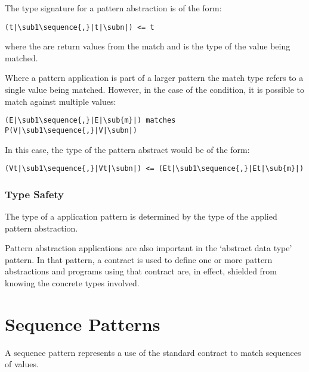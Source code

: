 The type signature for a pattern abstraction is of the form:
\begin{lstlisting}[escapechar=|]
(t|\sub1\sequence{,}|t|\subn|) <= t
\end{lstlisting}
where the  are return values from the match and  is the type of the value being matched.

Where a pattern application is part of a larger pattern the match type refers to a single value being matched. However, in the case of the  condition, it is possible to match against multiple values:
\begin{lstlisting}[escapechar=|]
(E|\sub1\sequence{,}|E|\sub{m}|) matches P(V|\sub1\sequence{,}|V|\subn|)
\end{lstlisting}
In this case, the type of the pattern abstract  would be of the form:
\begin{lstlisting}[escapechar=|]
(Vt|\sub1\sequence{,}|Vt|\subn|) <= (Et|\sub1\sequence{,}|Et|\sub{m}|)
\end{lstlisting}


\subsubsection{Type Safety}
The type of a application pattern is determined by the type of the applied pattern abstraction.

\begin{prooftree}
\end{prooftree}

\begin{aside}
Pattern abstraction applications are also important in the `abstract data type' pattern. In that pattern, a contract is used to define one or more pattern abstractions and programs using that contract are, in effect, shielded from knowing the concrete types involved.
\end{aside}


\section{Sequence Patterns}
\label{sequencePattern}

A sequence pattern represents a use of the standard  contract to match sequences of values.

